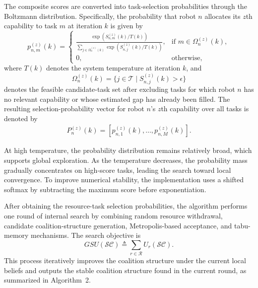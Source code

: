 \documentclass[journal,twoside,web]{ieeecolor}
\begin{document}
The composite scores are converted into task-selection probabilities through the Boltzmann distribution. Specifically, the probability that robot $n$ allocates its $z$th capability to task $m$ at iteration $k$ is given by
\begin{equation}
p_{n,m}^{(z)}(k) =
\begin{cases}
\frac{\exp\left( S_{n,m}^{(z)}(k) / T(k) \right)}{\sum\limits_{j \in \Omega_n^{(z)}(k)} \exp\left( S_{n,j}^{(z)}(k) / T(k) \right)}, & \text{if } m \in \Omega_n^{(z)}(k), \\[6pt]
0, & \text{otherwise},
\end{cases}
\label{eq:boltzmann_prob}
\end{equation}
where $T(k)$ denotes the system temperature at iteration $k$, and
\[
\Omega_n^{(z)}(k) = \{j \in \mathcal{T} \mid S_{n,j}^{(z)}(k) > \epsilon\}
\]
denotes the feasible candidate-task set after excluding tasks for which robot $n$ has no relevant capability or whose estimated gap has already been filled. The resulting selection-probability vector for robot $n$'s $z$th capability over all tasks is denoted by
\begin{align}
    P_n^{(z)}(k) = \left[ p_{n,1}^{(z)}(k), \ldots, p_{n,M}^{(z)}(k) \right].
    \label{xiangliang}
\end{align}

At high temperature, the probability distribution remains relatively broad, which supports global exploration. As the temperature decreases, the probability mass gradually concentrates on high-score tasks, leading the search toward local convergence. To improve numerical stability, the implementation uses a shifted softmax by subtracting the maximum score before exponentiation.

After obtaining the resource-task selection probabilities, the algorithm performs one round of internal search by combining random resource withdrawal, candidate coalition-structure generation, Metropolis-based acceptance, and tabu-memory mechanisms. The search objective is
\begin{equation}
GSU(\mathcal{SC}) \triangleq \sum_{r \in \mathcal{R}} U_r(\mathcal{SC}).
\end{equation}
This process iteratively improves the coalition structure under the current local beliefs and outputs the stable coalition structure found in the current round, as summarized in Algorithm~2.

\end{document}
